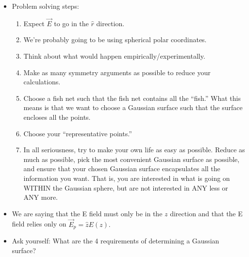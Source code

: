 \documentclass[12pt]{extreport}
\begin{document}
\begin{itemize}
		\item Problem solving steps:
		\begin{enumerate}
			\item Expect $\vec E$ to go in the $\hat r$ direction.
			\item We're probably going to be using spherical polar coordinates.
			\item Think about what would happen empirically/experimentally.
			\item Make as many symmetry arguments as possible to reduce your calculations.
			\item Choose a fish net such that the fish net contains all the ``fish.'' What this means is that we want to choose a Gaussian surface such that the surface encloses all the points.
			\item Choose your ``representative points.''
			\item In all seriousness, try to make your own life as easy as possible. Reduce as much as possible, pick the most convenient Gaussian surface as possible, and ensure that your chosen Gaussian surface encapsulates all the information you want. That is, you are interested in what is going on WITHIN the Gaussian sphere, but are not interested in ANY less or ANY more.
		\end{enumerate}

		\item We are saying that the E field must only be in the $z$ direction and that the E field relies only on $\vec E_p = \hat z E(z).$

		\item Ask yourself: What are the 4 requirements of determining a Gaussian surface?
	\end{itemize}
\end{document}
